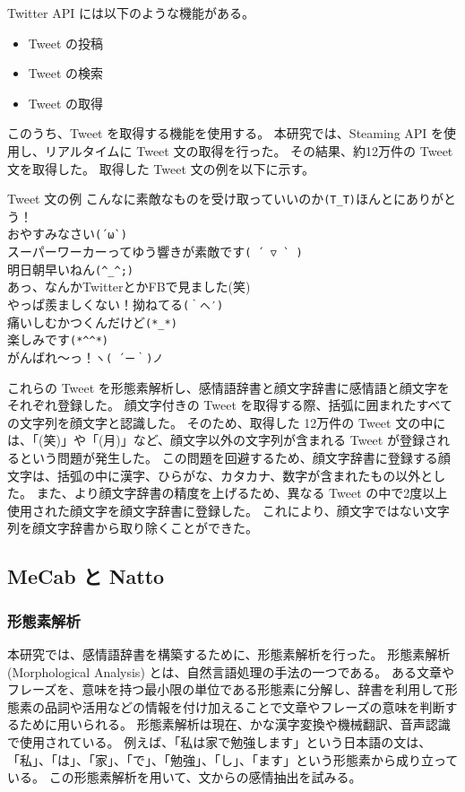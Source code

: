 \documentclass[11pt,a4j]{jsarticle}
\begin{document}
Twitter API には以下のような機能がある。

\begin{itemize}
  \item Tweet の投稿
  \item Tweet の検索
  \item Tweet の取得
\end{itemize}

このうち、Tweet を取得する機能を使用する。
本研究では、Steaming API を使用し、リアルタイムに Tweet 文の取得を行った。
その結果、約12万件の Tweet 文を取得した。
取得した Tweet 文の例を以下に示す。

\begin{itembox}[c]{Tweet 文の例}
  こんなに素敵なものを受け取っていいのか\verb|(T_T)|ほんとにありがとう！\\
  おやすみなさい\verb|(´ω`)| \\
  スーパーワーカーってゆう響きが素敵です\verb|( ´ ▽ ` )| \\
  明日朝早いねん\verb|(^_^;)| \\
  あっ、なんかTwitterとかFBで見ました(笑)\\
  やっぱ羨ましくない！拗ねてる\verb|(｀へ′)| \\
  痛いしむかつくんだけど\verb|(*_*)| \\
  楽しみです\verb|(*^^*)| \\
  がんばれ〜っ！\verb|ヽ( ´ー｀)ノ|\\
\end{itembox}

これらの Tweet を形態素解析し、感情語辞書と顔文字辞書に感情語と顔文字をそれぞれ登録した。
顔文字付きの Tweet を取得する際、括弧に囲まれたすべての文字列を顔文字と認識した。
そのため、取得した 12万件の Tweet 文の中には、「(笑)」や「(月)」など、顔文字以外の文字列が含まれる Tweet が登録されるという問題が発生した。
この問題を回避するため、顔文字辞書に登録する顔文字は、括弧の中に漢字、ひらがな、カタカナ、数字が含まれたもの以外とした。
また、より顔文字辞書の精度を上げるため、異なる Tweet の中で2度以上使用された顔文字を顔文字辞書に登録した。
これにより、顔文字ではない文字列を顔文字辞書から取り除くことができた。


\subsection{MeCab と Natto}
\subsubsection{形態素解析}
本研究では、感情語辞書を構築するために、形態素解析を行った。
形態素解析 (Morphological Analysis) とは、自然言語処理の手法の一つである。
ある文章やフレーズを、意味を持つ最小限の単位である形態素に分解し、辞書を利用して形態素の品詞や活用などの情報を付け加えることで文章やフレーズの意味を判断するために用いられる。
形態素解析は現在、かな漢字変換や機械翻訳、音声認識で使用されている。
例えば、「私は家で勉強します」という日本語の文は、「私」、「は」、「家」、「で」、「勉強」、「し」、「ます」という形態素から成り立っている。
この形態素解析を用いて、文からの感情抽出を試みる。
\end{document}
